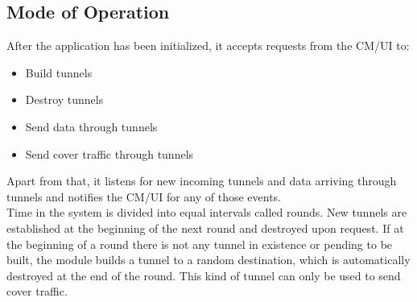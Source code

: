 \documentclass{article}
\begin{document}
	\subsection{Mode of Operation}
	After the application has been initialized, it accepts requests from the CM/UI to:
	\begin{itemize}
		\item Build tunnels
		\item Destroy tunnels
		\item Send data through tunnels
		\item Send cover traffic through tunnels
	\end{itemize}
	Apart from that, it listens for new incoming tunnels and data arriving through tunnels and notifies the CM/UI for any of those events. \\
	Time in the system is divided into equal intervals called rounds. New tunnels are established at the beginning of the next round and destroyed upon request. If at the beginning of a round there is not any tunnel in existence or pending to be built, the module builds a tunnel to a random destination, which is automatically destroyed at the end of the round. This kind of tunnel can only be used to send cover traffic.
	
\end{document}
